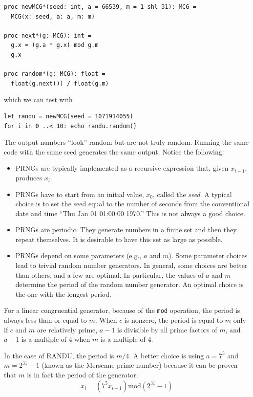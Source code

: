 \documentclass[justified, sixbynine]{tufte-book}
\def\ft{\small\tt}
\theoremstyle{plain}%
\newtheorem * {corollary}{Corollary}
\theoremstyle{definition}
\theoremstyle{remark}
\newtheorem * {remark}{Remark}
\newtheorem * {note}{Note}
\begin{document}
\begin{fullwidth}
\begin{lstlisting}[caption={in file: {\ft nlib/randomgen.nim}}]
proc newMCG*(seed: int, a = 66539, m = 1 shl 31): MCG =
  MCG(x: seed, a: a, m: m)

proc next*(g: MCG): int =
  g.x = (g.a * g.x) mod g.m
  g.x

proc random*(g: MCG): float =
  float(g.next()) / float(g.m)
\end{lstlisting}

which we can test with
\begin{lstlisting}
let randu = newMCG(seed = 1071914055)
for i in 0 ..< 10: echo randu.random()
\end{lstlisting}

The output numbers ``look'' random but are not truly random. Running the same code with the same seed generates the same output. Notice the following:

\begin{itemize}
\item  PRNGs are typically implemented as a recursive expression that, given $%
x_{i-1}$, produces $x_i$.


\item  PRNGs have to start from an initial value, $x_0$, called the {\it seed}.
A typical choice is to set the seed equal to the number of seconds from the
conventional date and time ``Thu Jan 01 01:00:00 1970.'' This is not always
a good choice.

\item PRNGs are periodic. They generate numbers in a finite set and then they repeat themselves. It is desirable to have this set as large as possible.

\item  PRNGs depend on some parameters (e.g., $a$ and $m$). Some
parameter choices lead to trivial random number generators. In
general, some choices are better than others, and a few are optimal. In
particular, the values of $a$ and $m$ determine the period of the random
number generator. An optimal choice is the one with the longest period.
\end{itemize}

For a linear congruential generator, because of the {\ft mod} operation, the period is always less than or equal to $m$. When $c$ is nonzero, the period is equal to $m$ only if $c$ and $m$ are relatively prime, $a-1$ is divisible by all prime factors of $m$, and $a-1$ is a multiple of 4 when $m$ is a multiple of $4$.

In the case of RANDU, the period is $m/4$. A better choice is using $a=7^5$ and $m=2^{31}-1$ (known as the Mersenne prime number) because it can be proven that $m$ is in fact the period of the generator:
\begin{equation}
x_i=(7^5x_{i-1})\textrm{mod}(2^{31}-1)  \label{Mersenne}
\end{equation}


\end{fullwidth}
\end{document}
